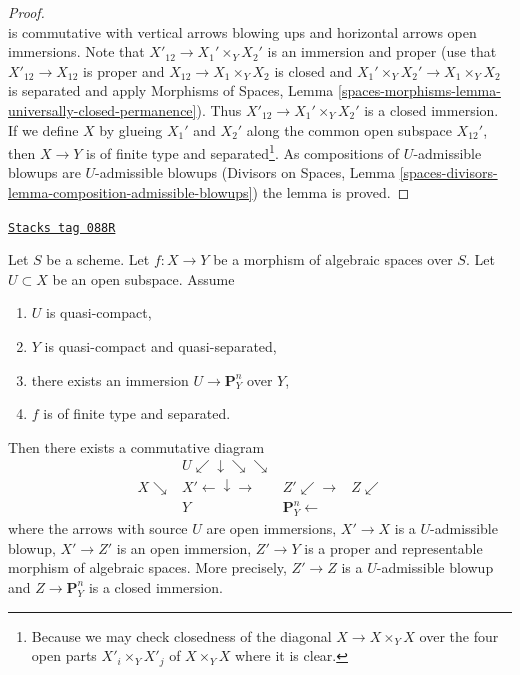 \begin{proof}
$$$$
is commutative with vertical arrows blowing ups and horizontal arrows
open immersions. Note that $X'_{12} \to X_1' \times_Y X_2'$ is
an immersion and proper (use that $X'_{12} \to X_{12}$ is proper
and $X_{12} \to X_1 \times_Y X_2$ is closed and $X_1' \times_Y X_2' \to
X_1 \times_Y X_2$ is separated and apply Morphisms of Spaces, Lemma
\ref{spaces-morphisms-lemma-universally-closed-permanence}).
Thus $X'_{12} \to  X_1' \times_Y X_2'$ is a closed immersion.
If we define $X$ by glueing $X_1'$ and $X_2'$ along the common open
subspace $X_{12}'$, then $X \to Y$ is of finite type and
separated\footnote{Because we may check closedness of the diagonal
$X \to X \times_Y X$ over the four open parts $X'_i \times_Y X'_j$
of $X \times_Y X$ where it is clear.}. As compositions of
$U$-admissible blowups are $U$-admissible blowups
(Divisors on Spaces, Lemma
\ref{spaces-divisors-lemma-composition-admissible-blowups})
the lemma is proved.
\end{proof}

\begin{lemma}
\label{spaces-more-morphisms-lemma-blowup-to-find-embedding}
\href{https://stacks.math.columbia.edu/tag/088R}{\texttt{Stacks tag 088R}}

Let $S$ be a scheme. Let $f : X \to Y$ be a morphism of algebraic spaces
over $S$. Let $U \subset X$ be an open subspace. Assume
\begin{enumerate}
\item $U$ is quasi-compact,
\item $Y$ is quasi-compact and quasi-separated,
\item there exists an immersion $U \to \mathbf{P}^n_Y$ over $Y$,
\item $f$ is of finite type and separated.
\end{enumerate}
Then there exists a commutative diagram
$$
\begin{array}{cccc} & U \swarrow\downarrow\searrow\searrow &  &  \\ X \searrow & X' \longleftarrow\downarrow\longrightarrow & Z' \swarrow\longrightarrow & Z \swarrow \\  & Y & \mathbf{P}^n_Y \longleftarrow & \end{array}
$$
where
the arrows with source $U$ are open immersions,
$X' \to X$ is a $U$-admissible blowup,
$X' \to Z'$ is an open immersion,
$Z' \to Y$ is a proper and representable morphism of algebraic spaces.
More precisely, $Z' \to Z$ is a $U$-admissible blowup
and $Z \to \mathbf{P}^n_Y$ is a closed immersion.
\end{lemma}

